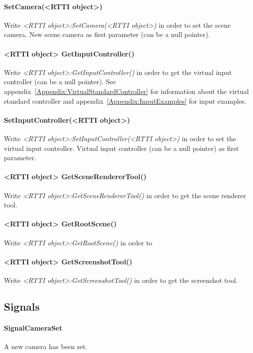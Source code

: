 \paragraph{SetCamera(<RTTI object>)}
Write \emph{<RTTI object>:SetCamera(<RTTI object>)} in order to set the scene camera. New scene camera as first parameter (can be a null pointer).

\paragraph{<RTTI object> GetInputController()}
Write \emph{<RTTI object>:GetInputController()} in order to get the virtual input controller (can be a null pointer). See appendix~\ref{Appendix:VirtualStandardController} for information about the virtual standard controller and appendix~\ref{Appendix:InputExamples} for input examples.

\paragraph{SetInputController(<RTTI object>)}
Write \emph{<RTTI object>:SetInputController(<RTTI object>)} in order to set the virtual input controller. Virtual input controller (can be a null pointer) as first parameter.

\paragraph{<RTTI object> GetSceneRendererTool()}
Write \emph{<RTTI object>:GetSceneRendererTool()} in order to get the scene renderer tool.

\paragraph{<RTTI object> GetRootScene()}
Write \emph{<RTTI object>:GetRootScene()} in order to 

\paragraph{<RTTI object> GetScreenshotTool()}
Write \emph{<RTTI object>:GetScreenshotTool()} in order to get the screenshot tool.


\subsection{Signals}

\paragraph{SignalCameraSet}
A new camera has been set.

